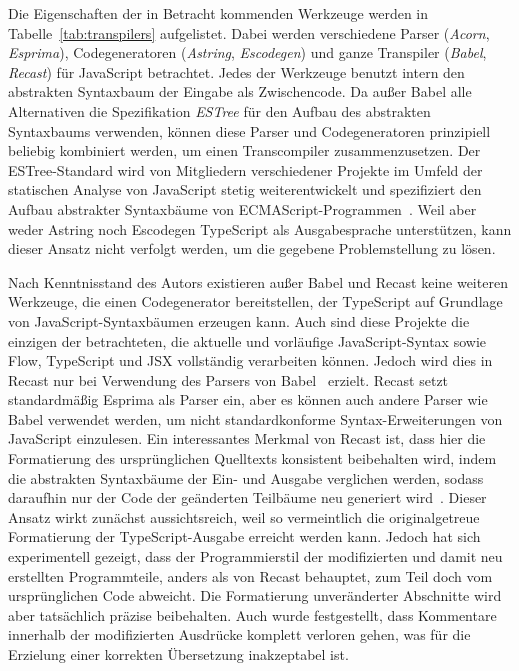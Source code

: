 

Die Eigenschaften der in Betracht kommenden Werkzeuge werden in Tabelle~\ref{tab:transpilers} aufgelistet. Dabei werden verschiedene Parser (\textit{Acorn}, \textit{Esprima}), Codegeneratoren (\textit{Astring}, \textit{Escodegen}) und ganze Transpiler (\textit{Babel}, \textit{Recast}) für JavaScript betrachtet. Jedes der Werkzeuge benutzt intern den abstrakten Syntaxbaum der Eingabe als Zwischencode. Da außer Babel alle Alternativen die Spezifikation \textit{ESTree} für den Aufbau des abstrakten Syntaxbaums verwenden, können diese Parser und Codegeneratoren prinzipiell beliebig kombiniert werden, um einen Transcompiler zusammenzusetzen. Der ESTree-Standard wird von Mitgliedern verschiedener Projekte im Umfeld der statischen Analyse von JavaScript stetig weiterentwickelt und spezifiziert den Aufbau abstrakter Syntaxbäume von ECMAScript-Programmen~\autocite{ESTREE_SPEC}. Weil aber weder Astring noch Escodegen TypeScript als Ausgabesprache unterstützen, kann dieser Ansatz nicht verfolgt werden, um die gegebene Problemstellung zu lösen.

Nach Kenntnisstand des Autors existieren außer Babel und Recast keine weiteren Werkzeuge, die einen Codegenerator bereitstellen, der TypeScript auf Grundlage von JavaScript-Syntaxbäumen erzeugen kann. Auch sind diese Projekte die einzigen der betrachteten, die aktuelle und vorläufige JavaScript-Syntax sowie Flow, TypeScript und JSX vollständig verarbeiten können. Jedoch wird dies in Recast nur bei Verwendung des Parsers von Babel~\autocite{BABEL:PARSER} erzielt. Recast setzt standardmäßig Esprima als Parser ein, aber es können auch andere Parser wie Babel verwendet werden, um nicht standardkonforme Syntax-Erweiterungen von JavaScript einzulesen. Ein interessantes Merkmal von Recast ist, dass hier die Formatierung des ursprünglichen Quelltexts konsistent beibehalten wird, indem die abstrakten Syntaxbäume der Ein- und Ausgabe verglichen werden, sodass daraufhin nur der Code der geänderten Teilbäume neu generiert wird~\autocite{RECAST}. Dieser Ansatz wirkt zunächst aussichtsreich, weil so vermeintlich die originalgetreue Formatierung der TypeScript-Ausgabe erreicht werden kann. Jedoch hat sich experimentell gezeigt, dass der Programmierstil der modifizierten und damit neu erstellten Programmteile, anders als von Recast behauptet, zum Teil doch vom ursprünglichen Code abweicht. Die Formatierung unveränderter Abschnitte wird aber tatsächlich präzise beibehalten. Auch wurde festgestellt, dass Kommentare innerhalb der modifizierten Ausdrücke komplett verloren gehen, was für die Erzielung einer korrekten Übersetzung inakzeptabel ist.

